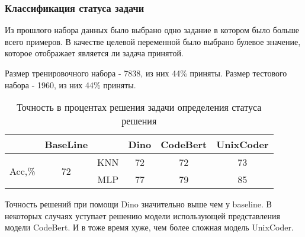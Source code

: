 \documentclass[../part_3.tex]{subfiles}
\begin{document}
\subsubsection{Классификация статуса задачи}
\par Из прошлого набора данных было выбрано одно задание в котором было больше всего примеров. В качестве целевой переменной было выбрано булевое значение, которое отображает является ли задача принятой.
\par Размер тренировочного набора - 7838, из них 44\% приняты. Размер тестового набора - 1960, из них 44\% приняты.
\begin{table}[H]
	\centering
	\begin{tabular}{|c|c||c|c|c|c|}\hline
		                        & BaseLine            &     & Dino & CodeBert & UnixCoder \\ \hline
		\multirow{2}{*}{Acc,\%} & \multirow{2}{*}{72} & KNN & 72      & 72       & 73        \\\cline{3-6}
		                        &                     & MLP & 77      & 79       & 85        \\\hline
	\end{tabular}
	\caption{Точность в процентах решения задачи определения статуса решения}
\end{table}
\par Точность решений при помощи Dino значительно выше чем у baseline. В некоторых случаях уступает решению модели использующей представления модели CodeBert. И в тоже время хуже, чем более сложная модель UnixCoder. %
\end{document}
